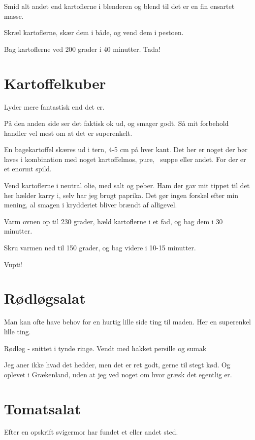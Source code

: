 \documentclass[
  letterpaper,
  DIV=11,
  numbers=noendperiod]{scrreprt}
\begin{document}
Smid alt andet end kartoflerne i blenderen og blend til det er en fin
ensartet masse.

Skræl kartoflerne, skær dem i både, og vend dem i pestoen.

Bag kartoflerne ved 200 grader i 40 minutter. Tada!

\hypertarget{kartoffelkuber}{%
\section{Kartoffelkuber}\label{kartoffelkuber}}

Lyder mere fantastisk end det er.

På den anden side ser det faktisk ok ud, og smager godt. Så mit
forbehold handler vel mest om at det er superenkelt.

En bagekartoffel skæres ud i tern, 4-5 cm på hver kant. Det her er noget
der bør laves i kombination med noget kartoffelmos, pure,~ suppe eller
andet. For der er et enormt spild.

Vend kartoflerne i neutral olie, med salt og peber. Ham der gav mit
tippet til det her hælder karry i, selv har jeg brugt paprika. Det gør
ingen forskel efter min mening, al smagen i krydderiet bliver brændt af
alligevel.

Varm ovnen op til 230 grader, hæld kartoflerne i et fad, og bag dem i 30
minutter.

Skru varmen ned til 150 grader, og bag videre i 10-15 minutter.

Vupti!

\hypertarget{ruxf8dluxf8gsalat}{%
\section{Rødløgsalat}\label{ruxf8dluxf8gsalat}}

Man kan ofte have behov for en hurtig lille side ting til maden. Her en
superenkel lille ting.

Rødløg - snittet i tynde ringe. Vendt med hakket persille og sumak

Jeg aner ikke hvad det hedder, men det er ret godt, gerne til stegt kød.
Og oplevet i Grækenland, uden at jeg ved noget om hvor græsk det
egentlig er.

\hypertarget{tomatsalat}{%
\section{Tomatsalat}\label{tomatsalat}}

Efter en opskrift svigermor har fundet et eller andet sted.
\end{document}
